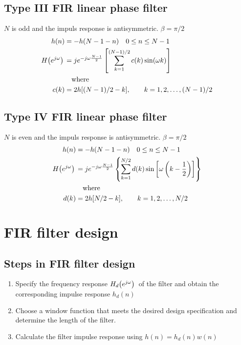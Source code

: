 \documentclass[accentcolor=tud4c,9.5pt,nochapname,bigchapter,paper=a5report]{tudreport}
\begin{document}
\subsection {Type III FIR linear phase filter}
$N$ is odd and the impuls response is antisymmetric. $\beta=\pi/2$ 
\begin{subequations}
\begin{align}
	h(n)&=-h(N-1-n) \quad 0\leq n \leq N-1 \\
	H{\left(e^{j\omega}\right)}\, &= je^{-j\omega \frac{N-1}{2}}\left[{\sum\limits_{k=1}^{(N-1)/2} c(k)\sin(\omega k)}\right]\\
	&\quad\text{where}\notag\\
	c(k)&=2h[(N-1)/2-k], \quad\quad k=1,2,\ldots,(N-1)/2 \notag
\end{align}
\end{subequations}

\subsection {Type IV FIR linear phase filter}
$N$ is even and the impuls response is antisymmetric. $\beta=\pi/2$ 
\begin{subequations}
\begin{align}
	h(n)&=-h(N-1-n) \quad 0\leq n \leq N-1 \\
	H{\left(e^{j\omega}\right)}\, &= je^{-j\omega \frac{N-1}{2}}\left\{{\sum\limits_{k=1}^{N/2} d(k)\sin\left[\omega \left(k-\frac{1}{2}\right)\right]}\right\}\\
	&\quad\text{where}\notag\\
	d(k)&=2h[N/2-k], \quad\quad k=1,2,\ldots,N/2 \notag
\end{align}
\end{subequations}

\section{FIR filter design}
\subsection{Steps in FIR filter design}
\begin{enumerate}
  \item Specify the frequency response $H_d{\left(e^{j\omega}\right)}\,$ of the filter and obtain the corresponding impulse response $h_d(n)$
  \item Choose a window function that meets the desired design specification and determine the length of the filter.
  \item Calculate the filter impulse response using $h(n)=h_d(n)w(n)$
\end{enumerate} 
\end{document}
